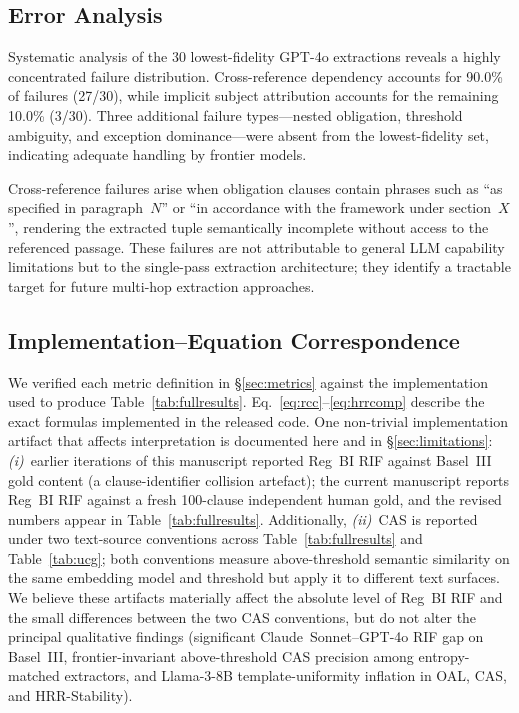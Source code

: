 \documentclass{article}
\begin{document}
\subsection{Error Analysis}

Systematic analysis of the 30 lowest-fidelity GPT-4o extractions
reveals a highly concentrated failure distribution.
Cross-reference dependency accounts for 90.0\% of failures (27/30),
while implicit subject attribution accounts for the remaining 10.0\%
(3/30).
Three additional failure types---nested obligation, threshold
ambiguity, and exception dominance---were absent from the
lowest-fidelity set, indicating adequate handling by frontier models.

Cross-reference failures arise when obligation clauses contain
phrases such as ``as specified in paragraph~$N$'' or ``in accordance
with the framework under section~$X$'', rendering the extracted tuple
semantically incomplete without access to the referenced passage.
These failures are not attributable to general LLM capability
limitations but to the single-pass extraction architecture; they
identify a tractable target for future multi-hop extraction approaches.

\subsection{Implementation--Equation Correspondence}
\label{sec:correspondence}

We verified each metric definition in \S\ref{sec:metrics} against the
implementation used to produce Table~\ref{tab:fullresults}.
Eq.~\ref{eq:rcc}--\ref{eq:hrrcomp} describe the exact formulas
implemented in the released code.
One non-trivial implementation artifact that affects interpretation
is documented here and in \S\ref{sec:limitations}:
\textit{(i)}~earlier iterations of this manuscript reported Reg~BI
RIF against Basel~III gold content (a clause-identifier collision
artefact); the current manuscript reports Reg~BI RIF against a
fresh 100-clause independent human gold, and the revised numbers
appear in Table~\ref{tab:fullresults}. Additionally,
\textit{(ii)}~CAS is reported under two text-source conventions across
Table~\ref{tab:fullresults} and Table~\ref{tab:ucg}; both conventions
measure above-threshold semantic similarity on the same embedding model
and threshold but apply it to different text surfaces.
We believe these artifacts materially affect the absolute level of
Reg~BI RIF and the small differences between the two CAS conventions,
but do not alter the principal qualitative findings (significant
Claude~Sonnet--GPT-4o RIF gap on Basel~III, frontier-invariant
above-threshold CAS precision among entropy-matched extractors,
and Llama-3-8B template-uniformity inflation in OAL, CAS, and
HRR-Stability).
\end{document}
